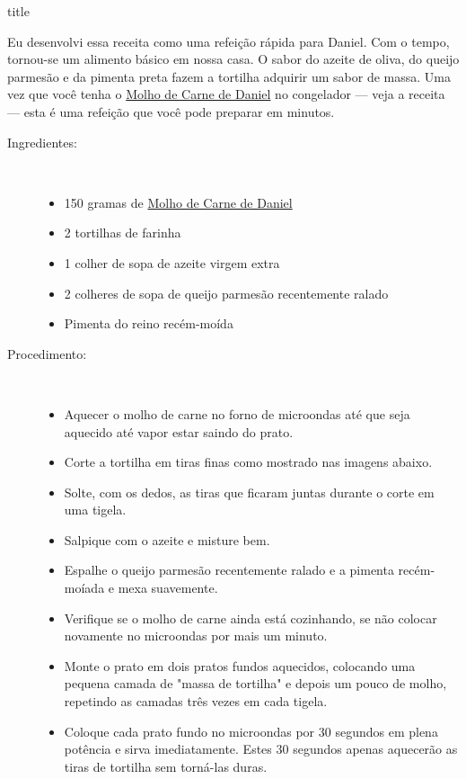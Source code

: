 \documentclass [11pt, letterpaper] {article}
\newcommand \fileName {TortillaPasta}
\begin{document}
 {title}

Eu desenvolvi essa receita como uma refeição rápida para Daniel. Com o tempo, tornou-se um alimento básico em nossa casa. O sabor do azeite de oliva, do queijo parmesão e da pimenta preta fazem a tortilha adquirir um sabor de massa. Uma vez que você tenha o \href {DanielsMeatSauce.html} {Molho de Carne de Daniel} no congelador --- veja a receita --- esta é uma refeição que você pode preparar em minutos.

\vspace {0.3in}
\begin {description}

\item [Ingredientes:] \ \\
\begin {itemize}
\item 150 gramas de \href {DanielsMeatSauce.html} {Molho de Carne de Daniel}
\item 2 tortilhas de farinha
\item 1 colher de sopa de azeite virgem extra
\item 2 colheres de sopa de queijo parmesão recentemente ralado
\item Pimenta do reino recém-moída
\end {itemize}

\item [Procedimento:] \ \\
\begin {itemize}
\item Aquecer o molho de carne no forno de microondas até que seja aquecido até vapor estar saindo do prato.
\item Corte a tortilha em tiras finas como mostrado nas imagens abaixo.
\item Solte, com os dedos, as tiras que ficaram juntas durante o corte em uma tigela.
\item Salpique com o azeite e misture bem.
\item Espalhe o queijo parmesão recentemente ralado e a pimenta recém-mo\'iada e mexa suavemente.
\item Verifique se o molho de carne ainda está cozinhando, se não colocar novamente no microondas por mais um minuto.
\item Monte o prato em dois pratos fundos aquecidos, colocando uma pequena camada de "massa de tortilha" e depois um pouco de molho, repetindo as camadas três vezes em cada tigela.
\item Coloque cada prato fundo no microondas por 30 segundos em plena potência e sirva imediatamente. Estes 30 segundos apenas aquecerão as tiras de tortilha sem torná-las duras.
\end {itemize}
\end{description}


\end{document}

